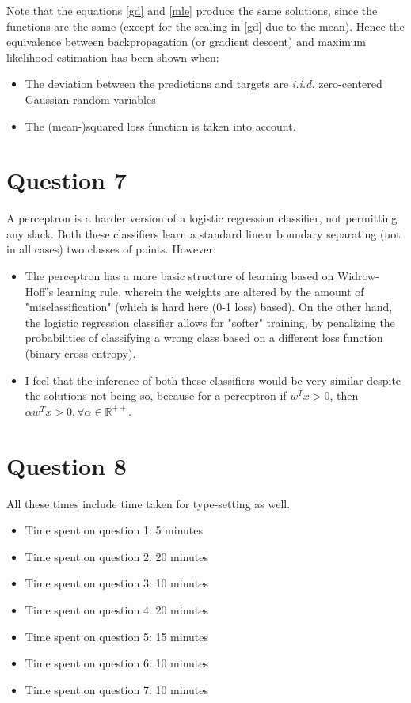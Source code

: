 \documentclass{article}
\begin{document}
\begin{flushleft}
Note that the equations \ref{gd} and \ref{mle} produce the same solutions, since the functions are the same (except for the scaling in \ref{gd} due to the mean). Hence the equivalence between backpropagation (or gradient descent) and maximum likelihood estimation has been shown when:
\begin{itemize}
\item The deviation between the predictions and targets are \textit{i.i.d.} zero-centered Gaussian random variables
\item The (mean-)squared loss function is taken into account.
\end{itemize}
\end{flushleft}

\section*{Question 7}
A perceptron is a harder version of a logistic regression classifier, not permitting any slack. Both these classifiers learn a standard linear boundary separating (not in all cases) two classes of points. However:
\begin{itemize}
\item The perceptron has a more basic structure of learning based on Widrow-Hoff's learning rule, wherein the weights are altered by the amount of "misclassification" (which is hard here (0-1 loss) based). On the other hand, the logistic regression classifier allows for "softer" training, by penalizing the probabilities of classifying a wrong class based on a different loss function (binary cross entropy).
\item I feel that the inference of both these classifiers would be very similar despite the solutions not being so, because for a perceptron if \(w^{T} x > 0\), then \(\alpha w^{T} x > 0, \forall \alpha \in \mathbb{R}^{++}\).
\end{itemize}

\section*{Question 8}
All these times include time taken for type-setting as well.
\begin{itemize}
\item Time spent on question 1: 5 minutes
\item Time spent on question 2: 20 minutes
\item Time spent on question 3: 10 minutes
\item Time spent on question 4: 20 minutes
\item Time spent on question 5: 15 minutes
\item Time spent on question 6: 10 minutes
\item Time spent on question 7: 10 minutes
\end{itemize}
\end{document}

